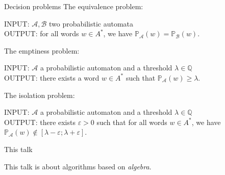 \documentclass[svgnames]{beamer}
\renewcommand{\AA}{\mathcal{A}}
\newcommand{\BB}{\mathcal{B}}
\newcommand{\QQ}{\mathbb{Q}}
\newcommand{\prob}[1]{\mathbb{P}_{#1}}
\begin{document}
\begin{frame}{Decision problems}
The equivalence problem:
\begin{framed}
INPUT: $\AA,\BB$ two probabilistic automata\\
OUTPUT: for all words $w \in A^*$, we have $\prob{\AA}(w) = \prob{\BB}(w)$.
\end{framed}

The emptiness problem:
\begin{framed}
INPUT: $\AA$ a probabilistic automaton and a threshold $\lambda \in \QQ$\\
OUTPUT: there exists a word $w \in A^*$ such that $\prob{\AA}(w) \ge \lambda$.
\end{framed}

The isolation problem:
\begin{framed}
INPUT: $\AA$ a probabilistic automaton and a threshold $\lambda \in \QQ$\\
OUTPUT: there exists $\varepsilon > 0$ such that
for all words $w \in A^*$, we have $\prob{\AA}(w) \notin [\lambda - \varepsilon ; \lambda + \varepsilon]$.
\end{framed}
\end{frame}

\begin{frame}{This talk}

\begin{center}
This talk is about algorithms based on \textit{algebra}.
\end{center}

\end{frame}
\end{document}
